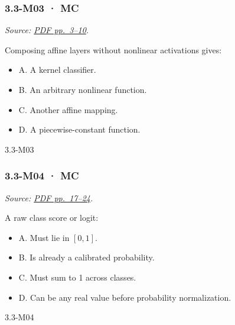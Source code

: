 \noindent\begin{minipage}{\linewidth}

\subsubsection{3.3-M03 · MC}\label{m03-mc-9}

\emph{Source:
\href{../Lecture\%20Slides/3.3.\%20Deep\%20Learning\%20Fundamentals.pdf\#page=3}{PDF
pp.~3--10}.}

Composing affine layers without nonlinear activations gives:

\begin{itemize}
\tightlist
\item
  A. A kernel classifier.
\item
  B. An arbitrary nonlinear function.
\item
  C. Another affine mapping.
\item
  D. A piecewise-constant function.
\end{itemize}

\begin{solution}[8mm]{3.3-M03}

\end{solution}
\end{minipage}\par\medskip

\noindent\begin{minipage}{\linewidth}

\subsubsection{3.3-M04 · MC}\label{m04-mc-9}

\emph{Source:
\href{../Lecture\%20Slides/3.3.\%20Deep\%20Learning\%20Fundamentals.pdf\#page=17}{PDF
pp.~17--24}.}

A raw class score or logit:

\begin{itemize}
\tightlist
\item
  A. Must lie in \([0,1]\).
\item
  B. Is already a calibrated probability.
\item
  C. Must sum to 1 across classes.
\item
  D. Can be any real value before probability normalization.
\end{itemize}

\begin{solution}[8mm]{3.3-M04}

\end{solution}
\end{minipage}\par\medskip


